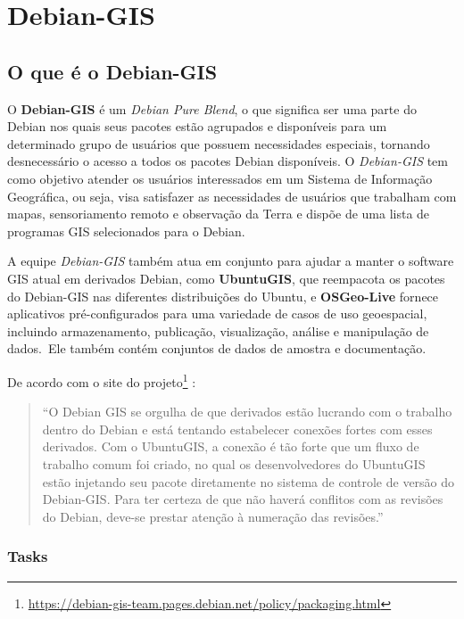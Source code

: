 \chapter{Debian-GIS}
\section{O que é o Debian-GIS}

O \textbf{Debian-GIS} é um \textit{Debian Pure Blend}, o que significa ser uma parte do Debian nos quais seus pacotes estão agrupados e disponíveis para um determinado grupo de usuários que possuem necessidades especiais, tornando desnecessário o acesso a todos os pacotes Debian disponíveis. O \textit{Debian-GIS} tem como objetivo atender os usuários interessados em um Sistema de Informação Geográfica, ou seja, visa satisfazer as necessidades de usuários que trabalham com mapas, sensoriamento remoto e observação da Terra e dispõe de uma lista de programas GIS selecionados para o Debian.

A equipe \textit{Debian-GIS} também atua em conjunto para ajudar a manter o software GIS atual em derivados Debian, como \textbf{UbuntuGIS}, que reempacota os pacotes do Debian-GIS nas diferentes distribuições do Ubuntu, e \textbf{OSGeo-Live} fornece aplicativos pré-configurados para uma variedade de casos de uso geoespacial, incluindo armazenamento, publicação, visualização, análise e manipulação de dados. Ele também contém conjuntos de dados de amostra e documentação.

De acordo com o site do projeto\footnote{\url{https://debian-gis-team.pages.debian.net/policy/packaging.html}} \cite{bib:gis}:

\begin{quote}
	``O Debian GIS se orgulha de que derivados estão lucrando com o trabalho dentro do Debian e está tentando estabelecer conexões fortes com esses derivados. Com o UbuntuGIS, a conexão é tão forte que um fluxo de trabalho comum foi criado, no qual os desenvolvedores do UbuntuGIS estão injetando seu pacote diretamente no sistema de controle de versão do Debian-GIS. Para ter certeza de que não haverá conflitos com as revisões do Debian, deve-se prestar atenção à numeração das revisões.''
\end{quote}

\subsection{Tasks}

